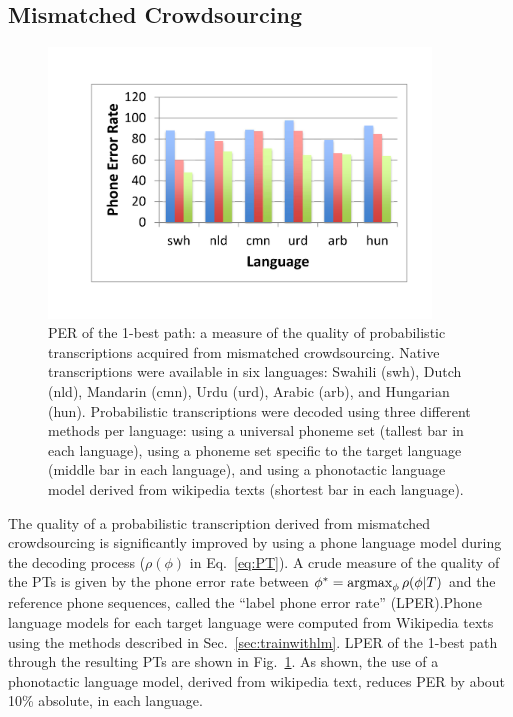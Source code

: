 \subsection{Mismatched Crowdsourcing}
\label{s6:mc}

\begin{figure}
  \centerline{\includegraphics[width=4in]{../figs/lm_results.pdf}}
  \caption{PER of the 1-best path: a measure of the quality of
    probabilistic transcriptions acquired from mismatched
    crowdsourcing.  Native transcriptions were available in six
    languages: Swahili (swh), Dutch (nld), Mandarin (cmn), Urdu (urd),
    Arabic (arb), and Hungarian (hun).  Probabilistic transcriptions
    were decoded using three different methods per language: using a
    universal phoneme set (tallest bar in each language), using a
    phoneme set specific to the target language (middle bar in each
    language), and using a phonotactic language model derived from
    wikipedia texts (shortest bar in each language).}
  \label{fig:pt_decode_per}
\end{figure}

The quality of a probabilistic transcription derived from mismatched
crowdsourcing is significantly improved by using a phone language
model during the decoding process ($\rho(\phi)$ in Eq.~\ref{eq:PT}).
A crude measure of the quality of the PTs is given by the phone error
rate between $\phi^* = \operatorname*{argmax}_{\phi} \rho(\phi|T)$ and the reference
phone sequences, called the ``label phone error rate'' (LPER).Phone
language models for each target language were computed from Wikipedia
texts using the methods described in Sec.~\ref{sec:trainwithlm}.
LPER of the 1-best path through the resulting PTs are shown in
Fig.~\ref{fig:pt_decode_per}.  As shown, the use of a phonotactic
language model, derived from wikipedia text, reduces PER by about 10\%
absolute, in each language.

